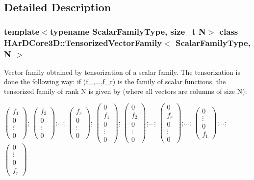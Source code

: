 \subsection{Detailed Description}
\subsubsection*{template$<$typename Scalar\+Family\+Type, size\+\_\+t N$>$\newline
class H\+Ar\+D\+Core3\+D\+::\+Tensorized\+Vector\+Family$<$ Scalar\+Family\+Type, N $>$}

Vector family obtained by tensorization of a scalar family. The tensorization is done the following way\+: if (f\+\_,...,f\+\_\+r) is the family of scalar functions, the tensorized family of rank N is given by (where all vectors are columns of size N)\+:

$\left(\begin{array}{c}f_1\\0\\\vdots\\0\end{array}\right)$; $\left(\begin{array}{c}f_2\\0\\\vdots\\0\end{array}\right)$;...; $\left(\begin{array}{c}f_r\\0\\\vdots\\0\end{array}\right)$; $\left(\begin{array}{c}0\\f_1\\0\\\vdots\\0\end{array}\right)$; $\left(\begin{array}{c}0\\f_2\\0\\\vdots\\0\end{array}\right)$;...; $\left(\begin{array}{c}0\\f_r\\0\\\vdots\\0\end{array}\right)$;...; $\left(\begin{array}{c}0\\\vdots\\0\\f_1\end{array}\right)$;...; $\left(\begin{array}{c}0\\\vdots\\0\\f_r\end{array}\right)$

